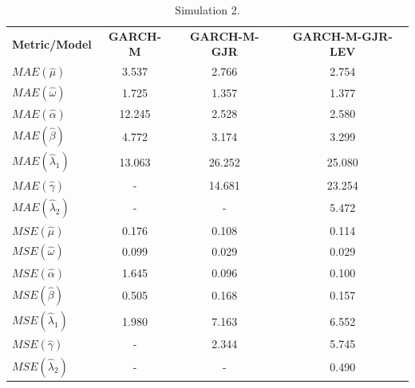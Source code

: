 \documentclass[authoryear, 1p]{elsarticle}
\numberwithin{equation}{section}
\begin{document}
\begin{table}[h!]
\centering
\caption{Simulation 2.}
\label{tab:ap_6}
\begin{tabular}{lccc}
\hline
\hline
\textbf{Metric/Model}    & \textbf{GARCH-M} & \textbf{GARCH-M-GJR} & \textbf{GARCH-M-GJR-LEV} \\

$MAE(\hat{\mu})$           & 3.537                             & 2.766                                  & 2.754                                       \\
$MAE(\hat{\omega})$        & 1.725                             & 1.357                                  & 1.377                                       \\
$MAE(\hat{\alpha})$        & 12.245                            & 2.528                                  & 2.580                                       \\
$MAE(\hat{\beta})$         & 4.772                             & 3.174                                  & 3.299                                       \\
$MAE(\hat{\lambda}_1)$       & 13.063                            & 26.252                                 & 25.080                                      \\
$MAE(\hat{\gamma})$        & -                             & 14.681                                 & 23.254                                      \\
$MAE(\hat{\lambda}_2)$    & -                             & -                                  & 5.472                                       \\
\hline
$MSE(\hat{\mu})$            & 0.176                             & 0.108                                  & 0.114                                       \\
$MSE(\hat{\omega})$        & 0.099                             & 0.029                                  & 0.029                                       \\
$MSE(\hat{\alpha})$        & 1.645                             & 0.096                                  & 0.100                                       \\
$MSE(\hat{\beta})$         & 0.505                             & 0.168                                  & 0.157                                       \\
$MSE(\hat{\lambda}_1)$       & 1.980                             & 7.163                                  & 6.552                                       \\
$MSE(\hat{\gamma})$        & -                             & 2.344                                  & 5.745                                       \\
$MSE(\hat{\lambda}_2)$    & -                             & -                                  & 0.490 \\
\hline
\hline                                       
\end{tabular}
\end{table}
\end{document}
